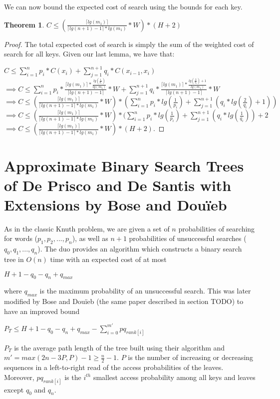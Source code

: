 \documentclass[letterpaper,12pt,titlepage,oneside,final]{book}
\theoremstyle{plain}
\newtheorem{thm}{Theorem}[section]
\begin{document}
We can now bound the expected cost of search using the bounds for each key.

\begin{thm}
$C \leq  (\frac{\lceil lg(m_1) \rceil}{\lceil lg(n+1) - 1 \rceil*lg(m_1)} * W) * (H + 2)$
\end{thm}

\begin{proof}
The total expected cost of search is simply the sum of the weighted cost of search for all keys. Given our last lemma, we have that:

$C \leq \sum_{i=1}^{n} p_i*C(x_i) + \sum_{j=1}^{n+1} q_i*C(x_{i-1},x_i)$ \\

$\implies C \leq \sum_{i=1}^{n} p_i*\frac{\lceil lg(m_1) \rceil * \frac{lg(\frac{1}{p_i})}{lg(m_1)}}{\lceil lg(n+1) - 1 \rceil} * W + \sum_{j=1}^{n+1} q_i*\frac{\lceil lg(m_1) \rceil * \frac{lg(\frac{2}{q_i})+ 1}{lg(m_1)}}{\lceil lg(n+1) - 1 \rceil} * W$ \\

$\implies C \leq  (\frac{\lceil lg(m_1) \rceil}{\lceil lg(n+1) - 1 \rceil*lg(m_1)} * W) * (\sum_{i=1}^{n} p_i*lg(\frac{1}{p_i}) + \sum_{j=1}^{n+1} (q_i*lg(\frac{2}{q_i})+ 1))$ \\

$\implies C \leq  (\frac{\lceil lg(m_1) \rceil}{\lceil lg(n+1) - 1 \rceil*lg(m_1)} * W) * (\sum_{i=1}^{n} p_i*lg(\frac{1}{p_i}) + \sum_{j=1}^{n+1} (q_i*lg(\frac{1}{q_i}))+ 2$ \\

$\implies C \leq  (\frac{\lceil lg(m_1) \rceil}{\lceil lg(n+1) - 1 \rceil*lg(m_1)} * W) * (H + 2)$.
\end{proof}

\section{Approximate Binary Search Trees of De Prisco and De Santis with Extensions by Bose and Dou\"{i}eb}

As in the classic Knuth problem, we are given a set of $n$ probabilities of searching for words ($p_1, p_2, ..., p_n$), as well as $n+1$ probabilities of unsuccessful searches ($q_0, q_1, ..., q_n$). The duo provides an algorithm which constructs a binary search tree in $O(n)$ time with an expected cost of at most \cite{de1993binary}
\begin{center}
$H+1-q_0-q_n+q_{max}$
\end{center}  where $q_{max}$ is the maximum probability of an unsuccessful search. This was later modified by Bose and Dou\"{i}eb (the same paper described in section TODO) to have an improved bound \cite{bose2009efficient}
\begin{center}
$P_T \leq H + 1 - q_0 - q_n + q_{max} - \sum_{i=0}^{m'} pq_{rank[i]}$
\end{center}
$P_T$ is the average path length of the tree built using their algorithm and $m'=max({2n-3P,P})-1 \geq \frac{n}{2} - 1$. $P$ is the number of increasing or decreasing sequences in a left-to-right read of the access probabilities of the leaves. Moreover, $pq_{rank[i]}$ is the $i^{th}$ smallest access probability among all keys and leaves except $q_0$ and $q_n$. \\
\end{document}
